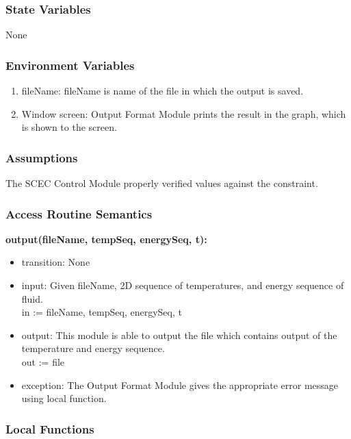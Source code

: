 \documentclass[12pt, titlepage]{article}
\begin{document}
\subsubsection{State Variables}

None

\subsubsection{Environment Variables}

\begin{enumerate}
    \item fileName: fileName is name of the file in which the output is saved. 
    \item Window screen: Output Format Module prints the result in the graph, which is shown to the screen. 
\end{enumerate}


\subsubsection{Assumptions}

The SCEC Control Module properly verified values against the constraint.   

\subsubsection{Access Routine Semantics}

\noindent \textbf{output(fileName, tempSeq, energySeq, t):}
\begin{itemize}
\item transition: None 
\item input: Given fileName, 2D sequence of temperatures, and energy sequence of fluid. \\
in := 
fileName,  
tempSeq,  
energySeq,
t 
\item output: This module is able to output the file which contains output of the temperature and energy sequence.\\  
out := file
\item exception: The Output Format Module gives the appropriate error message using local function. 
\end{itemize}

\subsubsection{Local Functions}
\end{document}

